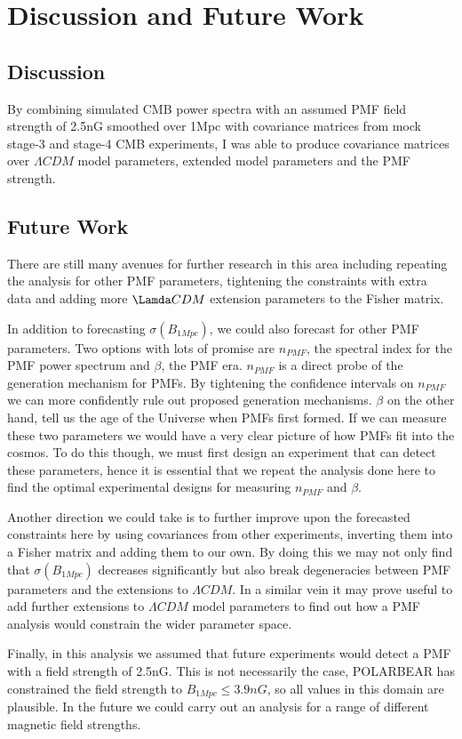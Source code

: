 \section{Discussion and Future Work}
\subsection{Discussion}

By combining simulated CMB power spectra with an assumed PMF field strength of 2.5nG smoothed over 1Mpc with covariance matrices from mock stage-3 and stage-4 CMB experiments, I was able to produce covariance matrices over $\Lambda CDM$ model parameters, extended model parameters and the PMF strength. 

\subsection{Future Work}

There are still many avenues for further research in this area including repeating the analysis for other PMF parameters, tightening the constraints with extra data and adding more $\Lamda CDM$ extension parameters to the Fisher matrix.

In addition to forecasting $\sigma(B_{1Mpc})$, we could also forecast for other PMF parameters. Two options with lots of promise are $n_{PMF}$, the spectral index for the PMF power spectrum and $\beta$, the PMF era. $n_{PMF}$ is a direct probe of the generation mechanism for PMFs. By tightening the confidence intervals on $n_{PMF}$ we can more confidently rule out proposed generation mechanisms. $\beta$ on the other hand, tell us the age of the Universe when PMFs first formed. If we can measure these two parameters we would have a very clear picture of how PMFs fit into the cosmos. To do this though, we must first design an experiment that can detect these parameters, hence it is essential that we repeat the analysis done here to find the optimal experimental designs for measuring $n_{PMF}$ and $\beta$.

Another direction we could take is to further improve upon the forecasted constraints here by using covariances from other experiments, inverting them into a Fisher matrix and adding them to our own. By doing this we may not only find that $\sigma(B_{1Mpc})$ decreases significantly but also break degeneracies between PMF parameters and the extensions to $\Lambda CDM$. In a similar vein it may prove useful to add further extensions to $\Lambda CDM$ model parameters to find out how a PMF analysis would constrain the wider parameter space.

Finally, in this analysis we assumed that future experiments would detect a PMF with a field strength of 2.5nG. This is not necessarily the case, POLARBEAR has constrained the field strength to $B_{1Mpc} \leq 3.9nG$, so all values in this domain are plausible. In the future we could carry out an analysis for a range of different magnetic field strengths.



